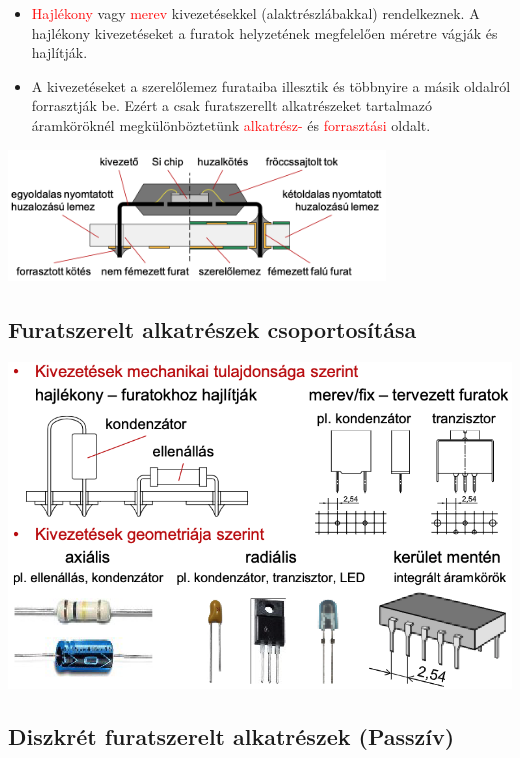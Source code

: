 \documentclass[11pt]{article}
\begin{document}
			\begin{itemize}
				\item \textcolor{red}{Hajlékony} vagy \textcolor{red}{merev} kivezetésekkel (alaktrészlábakkal) rendelkeznek. A hajlékony kivezetéseket a furatok helyzetének megfelelően méretre vágják és hajlítják.
				\item A kivezetéseket a szerelőlemez furataiba illesztik és többnyire a másik oldalról forrasztják be. Ezért a csak furatszerellt alkatrészeket tartalmazó áramköröknél megkülönböztetünk \textcolor{red}{alkatrész-} és \textcolor{red}{forrasztási} oldalt.
			\end{itemize}

			\begin{center}\includegraphics[width=0.75\textwidth]{images/2.3/1.png}\end{center}

		\subsection{Furatszerelt alkatrészek csoportosítása}

			\begin{center}\includegraphics[width=.95\textwidth]{images/2.4/1.png}\end{center}

		\subsection{Diszkrét furatszerelt alkatrészek (Passzív)}
\end{document}
